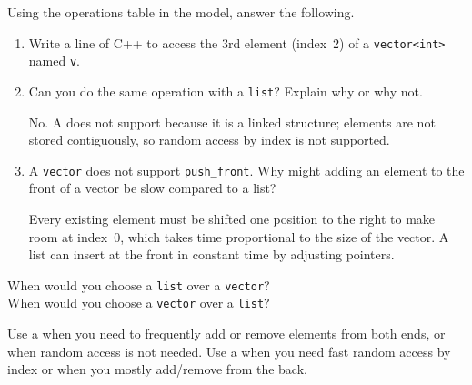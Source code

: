   \Q Using the operations table in the model, answer the following.
    \begin{enumerate}
      \itemsep 10pt
      \item Write a line of C++ to access the 3rd element (index~2)
        of a {\tt vector<int>} named {\tt v}.
        \hfill{}

      \item Can you do the same operation with a {\tt list}?
        Explain why or why not.
        \begin{answer}[0.5in]
          No. A  does not support  because it is
          a linked structure; elements are not stored contiguously,
          so random access by index is not supported.
        \end{answer}

      \item A {\tt vector} does not support {\tt push\_front}.  Why
        might adding an element to the front of a vector be slow compared
        to a list?
        \begin{answer}[0.5in]
          Every existing element must be shifted one position to the
          right to make room at index~0, which takes time proportional
          to the size of the vector.  A list can insert at the front
          in constant time by adjusting pointers.
        \end{answer}
    \end{enumerate}

  \vskip -20pt

  \Q When would you choose a {\tt list} over a {\tt vector}?  \key\\[-2mm]
    When would you choose a {\tt vector} over a {\tt list}?
    \begin{answer}[0.75in]
      Use a  when you need to frequently add or remove
      elements from both ends, or when random access is not needed.
      Use a  when you need fast random access by index
      or when you mostly add/remove from the back.
    \end{answer}


